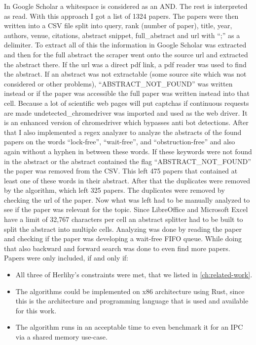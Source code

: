 In Google Scholar a whitespace is considered as an AND. The rest is interpreted as read. With this approach I got a list of 1324 papers. The papers were then written into a CSV file split into query, rank (number of paper), title, year, authors, venue, citations, abstract snippet, full\_abstract and url with \enquote{;} as a delimiter. To extract all of this the information in Google Scholar was extracted and then for the full abstract the scraper went onto the source url and extracted the abstract there. If the url was a direct pdf link, a pdf reader was used to find the abstract. If an abstract was not extractable (some source site which was not considered or other problems), \enquote{ABSTRACT\_NOT\_FOUND} was written instead or if the paper was accessible the full paper was written instead into that cell. Because a lot of scientific web pages will put captchas if continuous requests are made undetected\_chromedriver was imported and used as the web driver. It is an enhanced version of chromedriver which bypasses anti bot detections. After that I also implemented a regex analyzer to analyze the abstracts of the found papers on the words \enquote{lock-free}, \enquote{wait-free}, and \enquote{obstruction-free} and also again without a hyphen in between these words. If these keywords were not found in the abstract or the abstract contained the flag \enquote{ABSTRACT\_NOT\_FOUND} the paper was removed from the CSV. This left 475 papers that contained at least one of these words in their abstract. After that the duplicates were removed by the algorithm, which left 325 papers. The duplicates were removed by checking the url of the paper. Now what was left had to be manually analyzed to see if the paper was relevant for the topic. Since LibreOffice and Microsoft Excel have a limit of 32,767 characters per cell an abstract splitter had to be built to split the abstract into multiple cells. Analyzing was done by reading the paper and checking if the paper was developing a wait-free \ac{FIFO} queue. While doing that also backward and forward search was done to even find more papers. Papers were only included, if and only if: 
\begin{itemize}
   \item All three of Herlihy's constraints were met, that we listed in \cref{ch:related-work}.
   \item The algorithms could be implemented on x86 architecture using Rust, since this is the architecture and programming language that is used and available for this work.
   \item The algorithm runs in an acceptable time to even benchmark it for an \ac{IPC} via a shared memory use-case.
\end{itemize}

